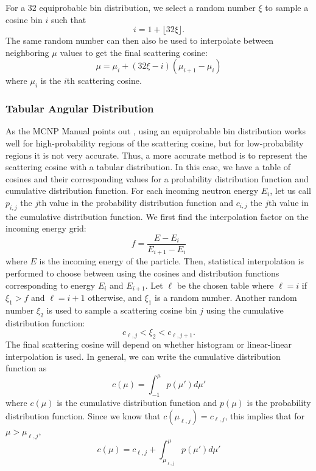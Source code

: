 For a 32 equiprobable bin distribution, we select a random number $\xi$ to
sample a cosine bin $i$ such that
\begin{equation}
  \label{eq:equiprobable-bin}
  i = 1 + \lfloor 32\xi \rfloor.
\end{equation}
The same random number can then also be used to interpolate between neighboring
$\mu$ values to get the final scattering cosine:
\begin{equation}
  \label{eq:equiprobable-cosine}
  \mu = \mu_i + (32\xi - i) (\mu_{i+1} - \mu_i)
\end{equation}
where $\mu_i$ is the $i$th scattering cosine.

\subsubsection{Tabular Angular Distribution}
\label{sec:angle-tabular}

As the MCNP Manual points out \cite{lanl-x5-2008}, using an equiprobable bin
distribution works well for high-probability regions of the scattering cosine,
but for low-probability regions it is not very accurate. Thus, a more accurate
method is to represent the scattering cosine with a tabular distribution. In
this case, we have a table of cosines and their corresponding values for a
probability distribution function and cumulative distribution function. For each
incoming neutron energy $E_i$, let us call $p_{i,j}$ the $j$th value in the
probability distribution function and $c_{i,j}$ the $j$th value in the
cumulative distribution function. We first find the interpolation factor on the
incoming energy grid:
\begin{equation}
  \label{eq:interpolation-factor}
  f = \frac{E - E_i}{E_{i+1} - E_i}
\end{equation}
where $E$ is the incoming energy of the particle. Then, statistical
interpolation is performed to choose between using the cosines and distribution
functions corresponding to energy $E_i$ and $E_{i+1}$. Let $\ell$ be the chosen
table where $\ell = i$ if $\xi_1 > f$ and $\ell = i + 1$ otherwise, and $\xi_1$
is a random number. Another random number $\xi_2$ is used to sample a scattering
cosine bin $j$ using the cumulative distribution function:
\begin{equation}
  \label{eq:sample-cdf}
  c_{\ell,j} < \xi_2 < c_{\ell,j+1}.
\end{equation}
The final scattering cosine will depend on whether histogram or linear-linear
interpolation is used. In general, we can write the cumulative distribution
function as
\begin{equation}
  \label{eq:cdf}
  c(\mu) = \int_{-1}^\mu p(\mu') d\mu'
\end{equation}
where $c(\mu)$ is the cumulative distribution function and $p(\mu)$
is the probability distribution function. Since we know that
$c(\mu_{\ell,j}) = c_{\ell,j}$, this implies that for $\mu >
\mu_{\ell,j}$,
\begin{equation}
  \label{eq:cdf-2}
  c(\mu) = c_{\ell,j} + \int_{\mu_{\ell,j}}^{\mu} p(\mu') d\mu'
\end{equation}

